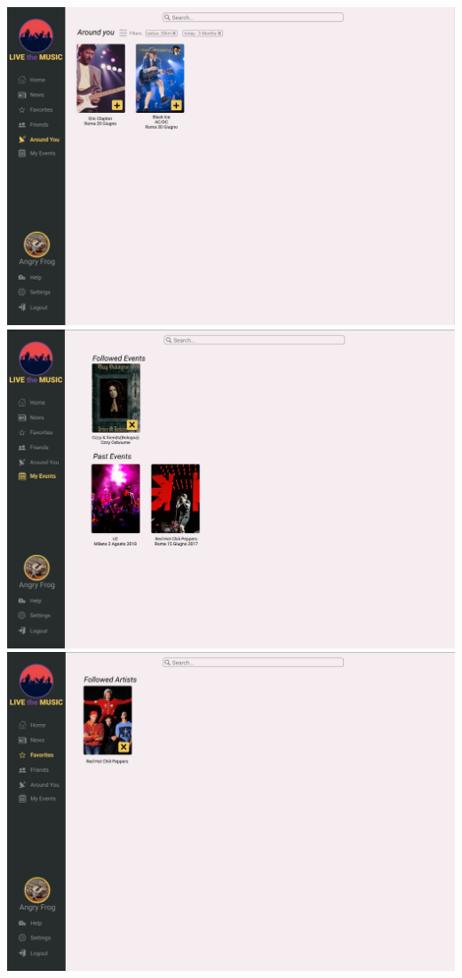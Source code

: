 \documentclass[11pt,a4paper]{article}
\begin{document}
\includegraphics[scale=0.75]{AroundYou.jpg}
\includegraphics[scale=0.75]{MyEvents.jpg}
\includegraphics[scale=0.75]{Favorites.jpg}
\end{document}
